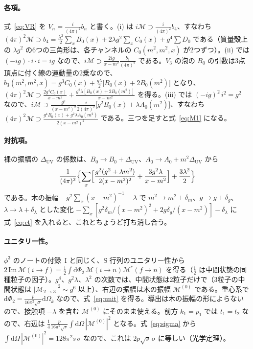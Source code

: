 \documentclass[a4paper,10pt]{ltjsarticle}
\newcommand{\dd}{\mathrm{d}}
\begin{document}
\paragraph{各項。}式~\eqref{eq:VR} を $V_n=\frac{i}{(4\pi)^2}b_n$ と書く。(i) は $i\mathcal{M}\supset\frac{i}{(4\pi)^2}b_4$、すなわち $(4\pi)^2\mathcal{M}\supset b_4=\frac{\lambda^2}{2}\sum_xB_0(x)+2\lambda g^2\sum_xC_0(x)+g^4\sum D_0$ である（質量殻上の $\lambda g^2$ の6つの三角形は、各チャンネルの $C_0(m^2,m^2,x)$ が2つずつ）。(ii) では $(-ig)\cdot i\cdot i=ig$ なので、$i\mathcal{M}\supset\frac{2ig}{x-m^2}\frac{b_3}{(4\pi)^2}$ である。$V_3$ の泡の $B_0$ の引数は3点頂点に付く線の運動量の2乗なので、$b_3(m^2,m^2,x)=g^3C_0(x)+\frac{g\lambda}{2}\bigl[B_0(x)+2B_0(m^2)\bigr]$ となり、$(4\pi)^2\mathcal{M}\supset\frac{2g^4C_0(x)}{x-m^2}+\frac{g^2\lambda[B_0(x)+2B_0(m^2)]}{x-m^2}$ を得る。(iii) では $(-ig)^2\,i^2=g^2$ なので、$i\mathcal{M}\supset\frac{g^2}{(x-m^2)^2}\frac{i}{2(4\pi)^2}\bigl[g^2B_0(x)+\lambda A_0(m^2)\bigr]$、すなわち $(4\pi)^2\mathcal{M}\supset\frac{g^4B_0(x)+g^2\lambda A_0(m^2)}{2(x-m^2)^2}$ である。三つを足すと式~\eqref{eq:M1} になる。

\paragraph{対抗項。}裸の振幅の $\Delta_{\mathrm{UV}}$ の係数は、$B_0\to B_0+\Delta_{\mathrm{UV}}$、$A_0\to A_0+m^2\Delta_{\mathrm{UV}}$ から
\begin{equation*}
\frac{1}{(4\pi)^2}\Bigl\{\sum_x\Bigl[\frac{g^2(g^2+\lambda m^2)}{2(x-m^2)^2}+\frac{3g^2\lambda}{x-m^2}\Bigr]+\frac{3\lambda^2}{2}\Bigr\}
\end{equation*}
である。木の振幅 $-g^2\sum_x(x-m^2)^{-1}-\lambda$ で $m^2\to m^2+\delta_m$、$g\to g+\delta_g$、$\lambda\to\lambda+\delta_\lambda$ とした変化 $-\sum_x[g^2\delta_m/(x-m^2)^2+2g\delta_g/(x-m^2)]-\delta_\lambda$ に式~\eqref{eq:ct} を入れると、これとちょうど打ち消し合う。

\paragraph{ユニタリー性。}$\phi^3$ のノートの付録~I と同じく、S 行列のユニタリー性から $2\,\mathrm{Im}\,\mathcal{M}(i\to f)=\frac12\int\dd\Phi_2\,\mathcal{M}(i\to n)\mathcal{M}^*(f\to n)$ を得る（$\frac12$ は中間状態の同種粒子の因子）。$g^4$、$g^2\lambda$、$\lambda^2$ の次数では、中間状態は2粒子だけで（3粒子の中間状態は $|\mathcal{M}_{2\to3}|^2\sim g^6$ 以上）、右辺の振幅は木の振幅 $\mathcal{M}^{(0)}$ である。重心系で $\dd\Phi_2=\frac{p}{16\pi^2\sqrt s}\dd\Omega_k$ なので、式~\eqref{eq:unit} を得る。導出は木の振幅の形によらないので、接触項 $-\lambda$ を含む $\mathcal{M}^{(0)}$ にそのまま使える。前方 $k_1=p_1$ では $t_1=t_2$ なので、右辺は $\frac14\frac{p}{16\pi^2\sqrt s}\int\dd\Omega\,|\mathcal{M}^{(0)}|^2$ となる。式~\eqref{eq:sigma} から $\int\dd\Omega\,|\mathcal{M}^{(0)}|^2=128\pi^2s\,\sigma$ なので、これは $2p\sqrt s\,\sigma$ に等しい（光学定理）。
\end{document}
